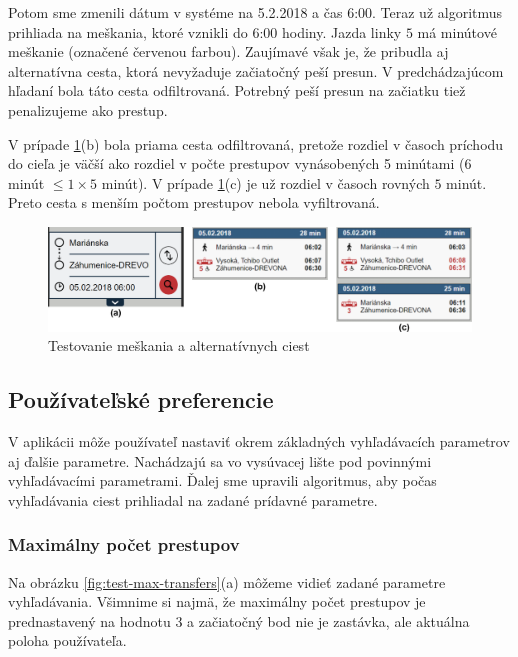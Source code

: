 Potom sme zmenili dátum v systéme na 5.2.2018 a čas 6:00. Teraz už algoritmus prihliada na meškania, ktoré vznikli do 6:00 hodiny. Jazda linky $5$ má minútové meškanie (označené červenou farbou). Zaujímavé však je, že pribudla aj alternatívna cesta, ktorá nevyžaduje začiatočný peší presun. V predchádzajúcom hľadaní bola táto cesta odfiltrovaná. Potrebný peší presun na začiatku tiež penalizujeme ako prestup. 
 
V prípade \ref{fig:test-delay-alternative}(b) bola priama cesta odfiltrovaná, pretože rozdiel v časoch príchodu do cieľa je väčší ako rozdiel v počte prestupov vynásobených 5 minútami ($6$ minút $\leq 1\times5$ minút).
V prípade \ref{fig:test-delay-alternative}(c) je už rozdiel v časoch rovných $5$ minút. Preto cesta s menším počtom prestupov nebola vyfiltrovaná.

\begin{figure}[H]
\centerline{\includegraphics[width=1.0\textwidth]{images/test/delay-alternative}}
\caption[Testovanie meškania a alternatívnych ciest]{Testovanie meškania a alternatívnych ciest}
\label{fig:test-delay-alternative}
\end{figure}

\subsection{Používateľské preferencie}

V aplikácii môže používateľ nastaviť okrem základných vyhľadávacích parametrov aj ďalšie parametre. Nachádzajú sa vo vysúvacej lište pod povinnými vyhľadávacími parametrami. Ďalej sme upravili algoritmus, aby počas vyhľadávania ciest prihliadal na zadané prídavné parametre.

\subsubsection{Maximálny počet prestupov}
Na obrázku \ref{fig:test-max-transfers}(a) môžeme vidieť zadané parametre vyhľadávania. Všimnime si najmä, že maximálny počet prestupov je prednastavený na hodnotu $3$ a začiatočný bod nie je zastávka, ale aktuálna poloha používateľa. 

